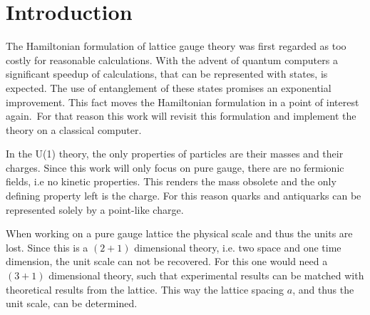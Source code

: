 \section{Introduction}
The Hamiltonian formulation of lattice gauge theory was first regarded as too costly for reasonable calculations. With the advent of quantum computers a significant speedup of calculations, that can be represented with states, is expected. The use of entanglement of these states promises an exponential improvement. This fact moves the Hamiltonian formulation in a point of interest again.\cite{Feynman1982, Bañuls2020}\ For that reason this work will revisit this formulation and implement the theory on a classical computer.

In the U(1) theory, the only properties of particles are their masses and their charges. Since this work will only focus on pure gauge, there are no fermionic fields, i.e no kinetic properties. This renders the mass obsolete and the only defining property left is the charge. For this reason quarks and antiquarks can be represented solely by a point-like charge.

When working on a pure gauge lattice the physical scale and thus the units are lost. Since this is a $(2+1)$ dimensional theory, i.e. two space and one time dimension, the unit scale can not be recovered. For this one would need a $(3+1)$ dimensional theory, such that experimental results can be matched with theoretical results from the lattice. This way the lattice spacing $a$, and thus the unit scale, can be determined.


